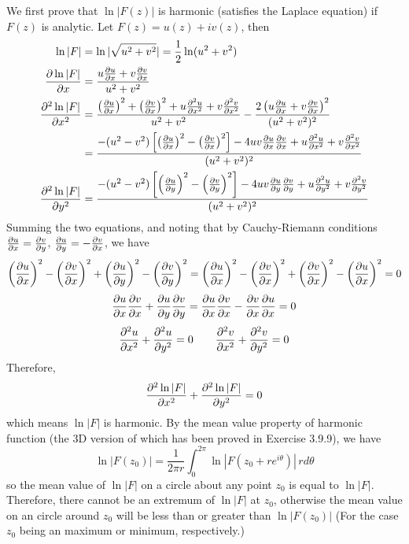 \documentclass[a4paper]{article}
\begin{document}
We first prove that $\ln|F(z)|$ is harmonic (satisfies the Laplace equation) if $F(z)$ is analytic. Let $F(z)=u(z)+iv(z)$, then
\begin{equation*}
\begin{split}
    \ln|F| & = \ln|\sqrt{u^2+v^2}|=\frac{1}{2}\ln(u^2+v^2)\\
    \pdv{\ln|F|}{x} & =\frac{u\pdv{u}{x}+v\pdv{v}{x}}{u^2+v^2}\\
    \pdv{^2\ln|F|}{x^2}&=\frac{\lfpr{\pdv{u}{x}}^2+\lfpr{\pdv{v}{x}}^2+u\pdv{^2u}{x^2}+v\pdv{^2v}{x^2}}{u^2+v^2}-\frac{2\lfpr{u\pdv{u}{x}+v\pdv{v}{x} }^2}{(u^2+v^2)^2}\\
    &=\frac{-(u^2-v^2)\lfbr{\lfpr{\pdv{u}{x}}^2-\lfpr{\pdv{v}{x}}^2 }-4uv\pdv{u}{x}\pdv{v}{x}+u\pdv{^2u}{x^2}+v\pdv{^2v}{x^2} }{(u^2+v^2)^2}\\
    \pdv{^2\ln|F|}{y^2}&=\frac{-(u^2-v^2)\lfbr{\lfpr{\pdv{u}{y}}^2-\lfpr{\pdv{v}{y}}^2 }-4uv\pdv{u}{y}\pdv{v}{y}+u\pdv{^2u}{y^2}+v\pdv{^2v}{y^2} }{(u^2+v^2)^2}
\end{split}
\end{equation*}
Summing the two equations, and noting that by  Cauchy-Riemann conditions $\pdv{u}{x}=\pdv{v}{y}$,\; $\pdv{u}{y}=-\pdv{v}{x}$, we have
\[
\lfpr{\pdv{u}{x}}^2-\lfpr{\pdv{v}{x}}^2+\lfpr{\pdv{u}{y}}^2-\lfpr{\pdv{v}{y}}^2=\lfpr{\pdv{u}{x}}^2-\lfpr{\pdv{v}{x}}^2+\lfpr{\pdv{v}{x}}^2-\lfpr{\pdv{u}{x}}^2=0
\]
\[
\pdv{u}{x}\pdv{v}{x}+\pdv{u}{y}\pdv{v}{y}=\pdv{u}{x}\pdv{v}{x}-\pdv{v}{x}\pdv{u}{x}=0
\]
\[
\pdv{^2u}{x^2}+\pdv{^2u}{y^2}=0\qquad \pdv{^2v}{x^2}+\pdv{^2v}{y^2}=0
\]
Therefore,
\[
\pdv{^2\ln|F|}{x^2}+\pdv{^2\ln|F|}{y^2}=0
\]
which means $\ln|F|$ is harmonic. By the mean value property of harmonic function (the 3D version of which has been proved in Exercise 3.9.9), we have
\[
\ln|F(z_0)|=\frac{1}{2\pi r}\int_0^{2\pi}\ln|F(z_0+re^{i\theta})|\,rd\theta
\]
so the mean value of $\ln|F|$ on a circle about any point $z_0$ is equal to $\ln|F|$. Therefore, there cannot be an extremum of $\ln|F|$ at $z_0$, otherwise the mean value on an circle around $z_0$ will be less than or greater than $\ln|F(z_0)|$ (For the case $z_0$ being an maximum or minimum, respectively.)
\end{document}
